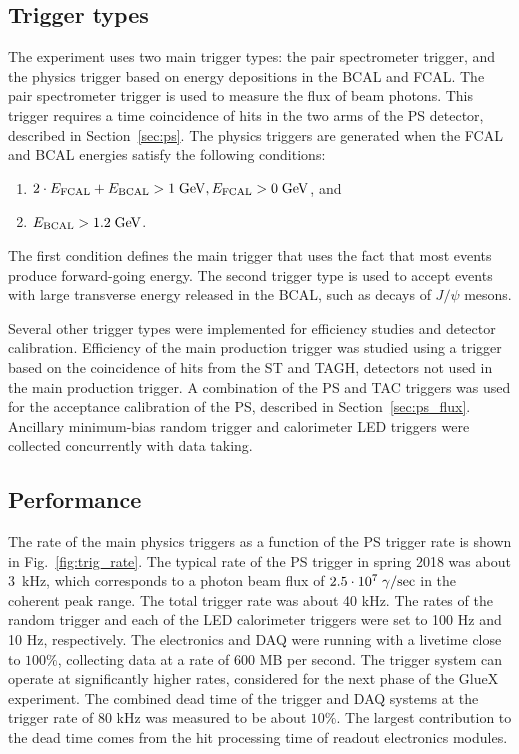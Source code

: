\subsection{Trigger types \label{sec:triggers}}

The \gx{} experiment uses two main trigger types: the pair spectrometer trigger, and the physics trigger based on energy depositions in the BCAL and FCAL. The 
pair spectrometer trigger is used to measure the flux of beam photons. This trigger requires a time coincidence of hits in the 
two arms of the PS detector, described in Section~\ref{sec:ps}. The physics triggers are generated when the FCAL and BCAL energies  satisfy the following conditions: 
\begin{enumerate}
\item $2\cdot E_{\rm FCAL} + E_{\rm BCAL}  > 1\;{\rm GeV},  E_{\rm FCAL} > 0\; {\rm GeV}$, \rm{and}  \\
\item $E_{\rm BCAL}  >  1.2\;{\rm GeV}$.
\end{enumerate}
The first condition defines the main trigger that uses the fact that most events produce forward-going energy. The second trigger type is used to accept events with large transverse energy released in the BCAL, such as decays of $J/\psi$ mesons. 

Several other trigger types were implemented for efficiency studies and detector calibration. 
Efficiency of the main production trigger was studied using a trigger based on the coincidence of hits from the ST and TAGH, detectors not used in the main production trigger. A combination of the PS and TAC triggers was used for the acceptance calibration of the PS, described in Section~\ref{sec:ps_flux}. Ancillary minimum-bias random trigger and calorimeter LED triggers were collected concurrently with data taking.

\subsection{Performance \label{sec:trigperformance}}
The rate of the main physics triggers as a function of the PS trigger rate is shown in Fig.~\ref{fig:trig_rate}.
The typical rate of the PS trigger in spring 2018 was about 3~kHz, which corresponds to a photon beam flux of $2.5\cdot 10^7\; \gamma/{\rm sec}$ in the coherent peak range. The total trigger rate was about 40 kHz. The rates of the random trigger and each of the LED calorimeter triggers were set to 100 Hz and 10 Hz, respectively. The electronics and DAQ were running with a livetime close to 
$100 \%$, collecting data at a rate of 600 MB per second.
The trigger system can operate at significantly higher rates, considered for the next phase
of the GlueX experiment. The combined dead time of the trigger and DAQ systems at the trigger rate of 80 kHz
was measured to be about $10 \%$. The largest contribution to the dead time comes from the hit processing
time of readout electronics modules. 

